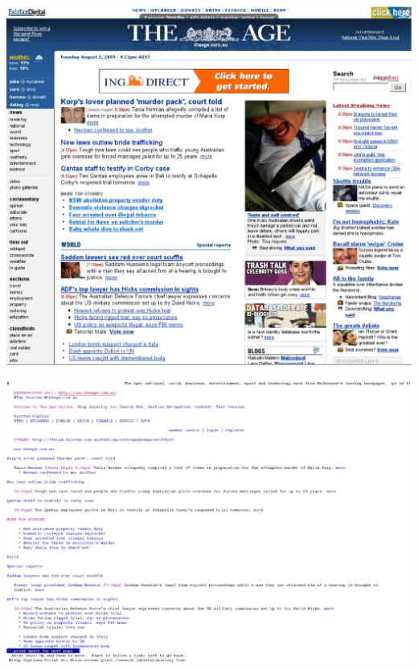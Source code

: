 \documentclass[a4paper,landscape,headrule,footrule,xetex]{foils}
\begin{document}

\begin{center}
  \includegraphics[height=0.95\textheight]{../pics/firefox.eps}
\end{center}






\begin{center}
  \includegraphics[height=1.0\textheight]{../pics/lynx.eps}
\end{center}
\end{document}
